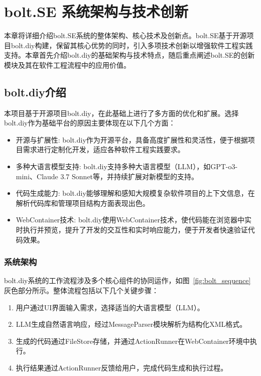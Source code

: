 \chapter{bolt.SE 系统架构与技术创新}

本章将详细介绍bolt.SE系统的整体架构、核心技术及创新点。bolt.SE基于开源项目bolt.diy构建，保留其核心优势的同时，引入多项技术创新以增强软件工程实践支持。本章首先介绍bolt.diy的基础架构与技术特点，随后重点阐述bolt.SE的创新模块及其在软件工程流程中的应用价值。

\section{bolt.diy介绍}

本项目基于开源项目bolt.diy，在此基础上进行了多方面的优化和扩展。选择bolt.diy作为基础平台的原因主要体现在以下几个方面：

\begin{itemize}
    \item 开源与扩展性: bolt.diy作为开源平台，具备高度扩展性和灵活性，便于根据项目需求进行定制化开发，适应各种软件工程实践要求。
    \item 多种大语言模型支持: bolt.diy支持多种大语言模型（LLM），如GPT-o3-mini、Claude 3.7 Sonnet等，并持续扩展对新模型的支持。
    \item 代码生成能力: bolt.diy能够理解和感知大规模复杂软件项目的上下文信息，在解析代码库和管理项目结构方面表现出色。
    \item WebContainer技术: bolt.diy使用WebContainer技术，使代码能在浏览器中实时执行并预览，提升了开发的交互性和实时响应能力，便于开发者快速验证代码效果。
\end{itemize}

\subsection{系统架构}

bolt.diy系统的工作流程涉及多个核心组件的协同运作，如图~\ref{fig:bolt_sequence}灰色部分所示。整体流程包括以下几个关键步骤：
\begin{enumerate}
    \item 用户通过UI界面输入需求，选择适当的大语言模型（LLM）。
    \item LLM生成自然语言响应，经过MessageParser模块解析为结构化XML格式。
    \item 生成的代码通过FileStore存储，并通过ActionRunner在WebContainer环境中执行。
    \item 执行结果通过ActionRunner反馈给用户，完成代码生成和执行过程。
\end{enumerate}

